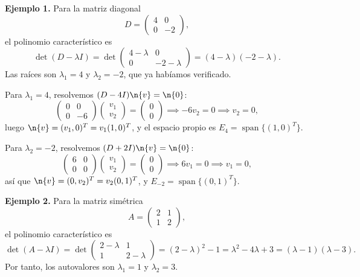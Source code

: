 \medskip

\noindent \textbf{Ejemplo 1.} Para la matriz diagonal
\[
D = \begin{pmatrix} 4 & 0 \\ 0 & -2 \end{pmatrix},
\]
el polinomio característico es
\[
\det(D - \lambda I) = \det\begin{pmatrix} 4-\lambda & 0 \\ 0 & -2-\lambda \end{pmatrix} = (4-\lambda)(-2-\lambda).
\]
Las raíces son $\lambda_1 = 4$ y $\lambda_2 = -2$, que ya habíamos verificado.

Para $\lambda_1 = 4$, resolvemos $(D - 4I)\n{v} = \n{0}$:
\[
\begin{pmatrix} 0 & 0 \\ 0 & -6 \end{pmatrix} \begin{pmatrix} v_1 \\ v_2 \end{pmatrix} = \begin{pmatrix} 0 \\ 0 \end{pmatrix}
\implies -6v_2 = 0 \implies v_2 = 0,
\]
luego $\n{v} = (v_1,0)^T = v_1(1,0)^T$, y el espacio propio es $E_4 = \operatorname{span}\{(1,0)^T\}$.

Para $\lambda_2 = -2$, resolvemos $(D + 2I)\n{v} = \n{0}$:
\[
\begin{pmatrix} 6 & 0 \\ 0 & 0 \end{pmatrix} \begin{pmatrix} v_1 \\ v_2 \end{pmatrix} = \begin{pmatrix} 0 \\ 0 \end{pmatrix}
\implies 6v_1 = 0 \implies v_1 = 0,
\]
así que $\n{v} = (0,v_2)^T = v_2(0,1)^T$, y $E_{-2} = \operatorname{span}\{(0,1)^T\}$.

\medskip

\noindent \textbf{Ejemplo 2.} Para la matriz simétrica
\[
A = \begin{pmatrix} 2 & 1 \\ 1 & 2 \end{pmatrix},
\]
el polinomio característico es
\[
\det(A - \lambda I) = \det\begin{pmatrix} 2-\lambda & 1 \\ 1 & 2-\lambda \end{pmatrix} = (2-\lambda)^2 - 1 = \lambda^2 - 4\lambda + 3 = (\lambda - 1)(\lambda - 3).
\]
Por tanto, los autovalores son $\lambda_1 = 1$ y $\lambda_2 = 3$.

